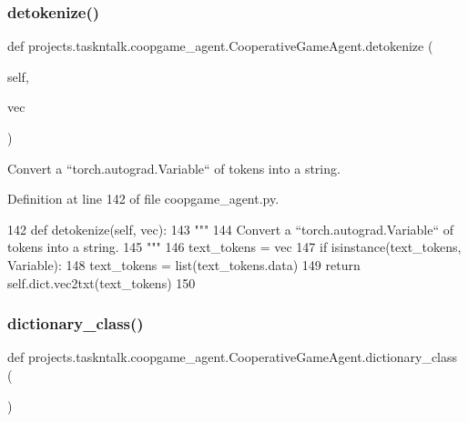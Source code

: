 \subsubsection{\texorpdfstring{detokenize()}{detokenize()}}
{\footnotesize\ttfamily def projects.\+taskntalk.\+coopgame\+\_\+agent.\+Cooperative\+Game\+Agent.\+detokenize (\begin{DoxyParamCaption}\item[{}]{self,  }\item[{}]{vec }\end{DoxyParamCaption})}

\begin{DoxyVerb}Convert a ``torch.autograd.Variable`` of tokens into a string.
\end{DoxyVerb}
 

Definition at line 142 of file coopgame\+\_\+agent.\+py.


\begin{DoxyCode}
142     \textcolor{keyword}{def }detokenize(self, vec):
143         \textcolor{stringliteral}{"""}
144 \textcolor{stringliteral}{        Convert a ``torch.autograd.Variable`` of tokens into a string.}
145 \textcolor{stringliteral}{        """}
146         text\_tokens = vec
147         \textcolor{keywordflow}{if} isinstance(text\_tokens, Variable):
148             text\_tokens = list(text\_tokens.data)
149         \textcolor{keywordflow}{return} self.dict.vec2txt(text\_tokens)
150 
\end{DoxyCode}
\mbox{\label{classprojects_1_1taskntalk_1_1coopgame__agent_1_1CooperativeGameAgent_aa7758c445e0e2213116e667184a6b31b}} 
\subsubsection{\texorpdfstring{dictionary\+\_\+class()}{dictionary\_class()}}
{\footnotesize\ttfamily def projects.\+taskntalk.\+coopgame\+\_\+agent.\+Cooperative\+Game\+Agent.\+dictionary\+\_\+class (\begin{DoxyParamCaption}{ }\end{DoxyParamCaption})\hspace{0.3cm}{\ttfamily [static]}}

